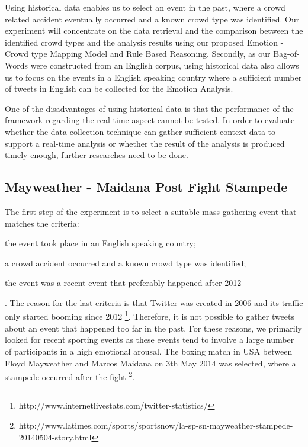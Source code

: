 Using historical data enables us to select an event in the past, where a crowd related accident eventually occurred and a known crowd type was identified. Our experiment will concentrate on the data retrieval and the comparison between the identified crowd types and the analysis results using our proposed Emotion - Crowd type Mapping Model and Rule Based Reasoning. Secondly, as our Bag-of-Words were constructed from an English corpus, using historical data also allows us to focus on the events in a English speaking country where a sufficient number of tweets in English can be collected for the Emotion Analysis.

One of the disadvantages of using historical data is that the performance of the framework regarding the real-time aspect cannot be tested. In order to evaluate whether the data collection technique can gather sufficient context data to support a real-time analysis or whether the result of the analysis is produced timely enough, further researches need to be done.

\subsection{Mayweather - Maidana Post Fight Stampede}

The first step of the experiment is to select a suitable mass gathering event that matches the criteria:
\begin{inparaenum}[i)]
\item the event took place in an English speaking country;
\item a crowd accident occurred and a known crowd type was identified;
\item the event was a recent event that preferably happened after 2012
\end{inparaenum}. The reason for the last criteria is that Twitter was created in 2006 and its traffic only started booming since 2012 \footnote{http://www.internetlivestats.com/twitter-statistics/}. Therefore, it is not possible to gather tweets about an event that happened too far in the past. For these reasons, we primarily looked for recent sporting events as these events tend to involve a large number of participants in a high emotional arousal. The boxing match in USA between Floyd Mayweather and Marcos Maidana on 3th May 2014 was selected, where a stampede occurred after the fight \footnote{http://www.latimes.com/sports/sportsnow/la-sp-sn-mayweather-stampede-20140504-story.html}. 

